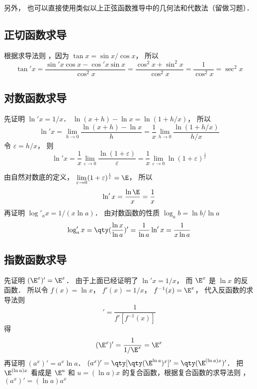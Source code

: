 另外， 也可以直接使用类似以上正弦函数推导中的几何法和代数法（留做习题）．

\subsection{正切函数求导}
根据求导法则%
，因为 $\tan x = \sin x/\cos x$， 所以
\begin{equation}
\tan' x = \frac{\sin' x \cos x - \cos' x\sin x}{\cos^2 x} = \frac{\cos^2x + \sin^2 x}{\cos^2 x} = \frac{1}{\cos ^2 x} = \sec ^2 x
\end{equation}

\subsection{对数函数求导}
先证明 $\ln' x = {1}/{x}$．  $\ln(x + h) - \ln x = \ln(1 + h/x)$， 所以
 \begin{equation}
\ln 'x = \lim_{h \to 0} \frac{\ln(x + h) - \ln x}{h} = \frac{1}{x} \lim_{h \to 0} \frac{\ln(1 + h/x)}{h/x}
\end{equation}
令 $\varepsilon  = h/x$， 则
\begin{equation}
\ln' x = \frac{1}{x} \lim_{\varepsilon  \to 0} \frac{\ln(1 + \varepsilon)}{\varepsilon } = \frac{1}{x} \lim_{\varepsilon  \to 0} \ln(1 + \varepsilon)^{\frac{1}{\varepsilon }} 
\end{equation}
 
由自然对数底的定义， $\lim\limits_{\varepsilon  \to 0} (1 + \varepsilon)^{\frac{1}{\varepsilon }} = \E$， 所以
 \begin{equation}
\ln 'x = \frac{\ln \E}{x} = \frac{1}{x}
\end{equation}
再证明 $\log'_a x = {1}/(x\ln a)$． 
由对数函数的性质 $\log_a b = \ln b/\ln a$
\begin{equation}
\log'_a x = \qty(\frac{\ln x}{\ln a})' = \frac{1}{\ln a}\ln' x = \frac{1}{x\ln a}
\end{equation}

\subsection{指数函数求导}
先证明 $(\E^x)' = \E^x$． 
由于上面已经证明了 $ \ln'x = 1/x$， 而 $\E^x$ 是 $\ln x$ 的反函数． 所以令 $f(x) = \ln x$， $f'(x) = 1/x$，  $f^{ - 1} (x) = \E^x$， 代入反函数的求导法则%
\begin{equation}
[f^{-1} (x)]' = \frac{1}{f'[f^{ - 1}(x)]}
\end{equation} 
得
\begin{equation}
(\E^x)' = \frac{1}{1/\E^x} = \E^x
\end{equation}
再证明 $(a^x)' = a^x \ln a$．  $(a^x)' = \qty[ \qty( \E^{\ln a} )^x ]' = \qty( \E^{(\ln a) x} )'$． 把 $\E^{(\ln a) x}$ 看成是 $\E^u$ 和 $u = (\ln a) x$ 的复合函数，根据复合函数的求导法则 ，$(a^x)' = (\ln a) a^x$ 
